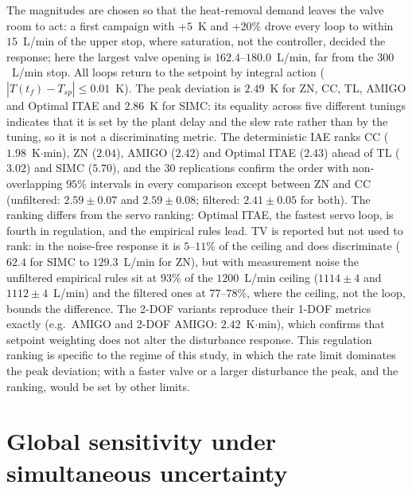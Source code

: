 \documentclass[11pt]{article}
\begin{document}
The magnitudes are chosen so that the heat-removal demand leaves the valve room to act: a first campaign with $+5$~K and $+20\%$ drove every loop to within $15$~L/min of the upper stop, where saturation, not the controller, decided the response; here the largest valve opening is $162.4$--$180.0$~L/min, far from the $300$~L/min stop. All loops return to the setpoint by integral action ($|T(t_f) - T_{sp}| \le 0.01$~K). The peak deviation is $2.49$~K for ZN, CC, TL, AMIGO and Optimal ITAE and $2.86$~K for SIMC: its equality across five different tunings indicates that it is set by the plant delay and the slew rate rather than by the tuning, so it is not a discriminating metric. The deterministic IAE ranks CC ($1.98$~K$\cdot$min), ZN ($2.04$), AMIGO ($2.42$) and Optimal ITAE ($2.43$) ahead of TL ($3.02$) and SIMC ($5.70$), and the $30$ replications confirm the order with non-overlapping $95\%$ intervals in every comparison except between ZN and CC (unfiltered: $2.59 \pm 0.07$ and $2.59 \pm 0.08$; filtered: $2.41 \pm 0.05$ for both). The ranking differs from the servo ranking: Optimal ITAE, the fastest servo loop, is fourth in regulation, and the empirical rules lead. TV is reported but not used to rank: in the noise-free response it is $5$--$11\%$ of the ceiling and does discriminate ($62.4$ for SIMC to $129.3$~L/min for ZN), but with measurement noise the unfiltered empirical rules sit at $93\%$ of the $1200$~L/min ceiling ($1114 \pm 4$ and $1112 \pm 4$~L/min) and the filtered ones at $77$--$78\%$, where the ceiling, not the loop, bounds the difference. The 2-DOF variants reproduce their 1-DOF metrics exactly (e.g.\ AMIGO and 2-DOF AMIGO: $2.42$~K$\cdot$min), which confirms that setpoint weighting does not alter the disturbance response. This regulation ranking is specific to the regime of this study, in which the rate limit dominates the peak deviation; with a faster valve or a larger disturbance the peak, and the ranking, would be set by other limits.

\section{Global sensitivity under simultaneous uncertainty}\label{supp:sobol}
\end{document}
